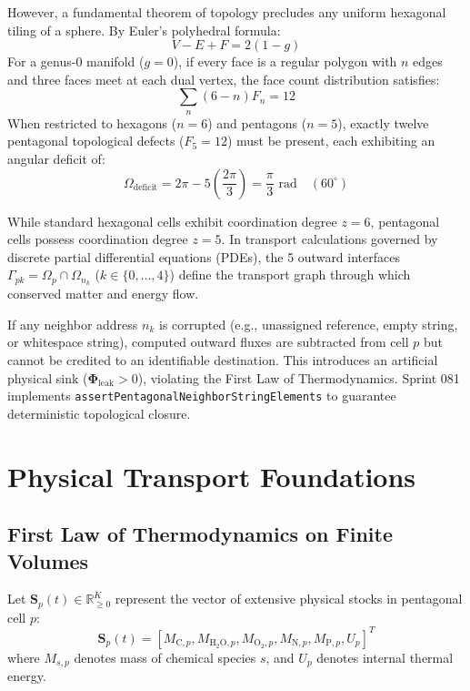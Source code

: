 \documentclass[10pt,journal,compsoc]{IEEEtran}
\begin{document}
However, a fundamental theorem of topology precludes any uniform hexagonal tiling of a sphere. By Euler's polyhedral formula:
\begin{equation}
V - E + F = 2(1 - g)
\end{equation}
For a genus-$0$ manifold ($g = 0$), if every face is a regular polygon with $n$ edges and three faces meet at each dual vertex, the face count distribution satisfies:
\begin{equation}
\sum_{n} (6 - n) F_n = 12
\end{equation}
When restricted to hexagons ($n = 6$) and pentagons ($n = 5$), exactly twelve pentagonal topological defects ($F_5 = 12$) must be present, each exhibiting an angular deficit of:
\begin{equation}
\Omega_{\text{deficit}} = 2\pi - 5 \left(\frac{2\pi}{3}\right) = \frac{\pi}{3} \text{ rad} \quad (60^\circ)
\end{equation}

While standard hexagonal cells exhibit coordination degree $z = 6$, pentagonal cells possess coordination degree $z = 5$. In transport calculations governed by discrete partial differential equations (PDEs), the 5 outward interfaces $\Gamma_{pk} = \Omega_p \cap \Omega_{n_k}$ ($k \in \{0, \dots, 4\}$) define the transport graph through which conserved matter and energy flow.

If any neighbor address $n_k$ is corrupted (e.g., unassigned reference, empty string, or whitespace string), computed outward fluxes are subtracted from cell $p$ but cannot be credited to an identifiable destination. This introduces an artificial physical sink ($\mathbf{\Phi}_{\text{leak}} > 0$), violating the First Law of Thermodynamics. Sprint 081 implements \texttt{assertPentagonalNeighborStringElements} to guarantee deterministic topological closure.

\section{Physical Transport Foundations}

\subsection{First Law of Thermodynamics on Finite Volumes}
Let $\mathbf{S}_p(t) \in \mathbb{R}_{\ge 0}^{K}$ represent the vector of extensive physical stocks in pentagonal cell $p$:
\begin{equation}
\mathbf{S}_p(t) = \left[ M_{\text{C}, p}, M_{\text{H}_2\text{O}, p}, M_{\text{O}_2, p}, M_{\text{N}, p}, M_{\text{P}, p}, U_p \right]^T
\end{equation}
where $M_{s, p}$ denotes mass of chemical species $s$, and $U_p$ denotes internal thermal energy.
\end{document}
